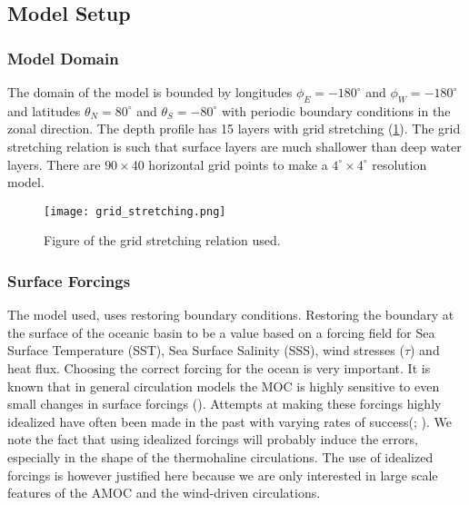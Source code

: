 
\subsection{Model Setup}
\subsubsection{Model Domain}
The domain of the model is bounded by longitudes $\phi_E=-180^{\circ}$ and $\phi_W=-180^{\circ}$ and latitudes $\theta_N=80^{\circ}$ and $\theta_S=-80^{\circ}$ with periodic boundary conditions in the zonal direction.
 The depth profile has 15 layers with grid stretching (\cref{fig:gridstrech}). The grid stretching relation is such that surface layers are much shallower than deep water layers. There are $90 \times 40$ horizontal grid points to make a $4^{\circ} \times 4^{\circ}$ resolution model.
 
 \begin{figure}[H]
 	\texttt{[image: grid\_stretching.png]}
 	\caption{Figure of the grid stretching relation used.}
 	\label{fig:gridstrech}
 \end{figure}

\subsubsection{Surface Forcings}
The model used, uses restoring boundary conditions. Restoring the boundary at the surface of the oceanic basin to be a value based on a forcing field for Sea Surface Temperature (SST), Sea Surface Salinity (SSS), wind stresses ($\tau$) and heat flux.
Choosing the correct forcing for the ocean is very important. It is known that in general circulation models the MOC is highly sensitive to even small changes in surface forcings (\cite{Milliff1999May}). Attempts at making these forcings highly idealized have often been made in the past with varying rates of success(\cite{bryan1987parameter}; \cite{Mulder2017Jul}). We note the fact that using idealized forcings will probably induce the errors, especially in the shape of the thermohaline circulations. The use of idealized forcings is however justified here because we are only interested in large scale features of the AMOC and the wind-driven circulations.


